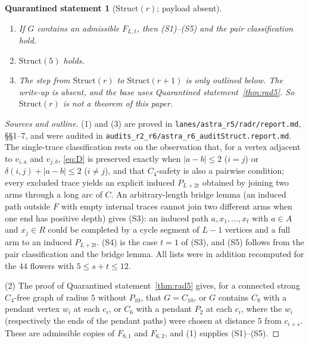 \documentclass[11pt]{amsart}
\newtheorem{qrecord}[theorem]{Quarantined statement}
\theoremstyle{definition}
\theoremstyle{remark}
\begin{document}
\begin{qrecord}[$\mathrm{Struct}(r)$; payload absent]\label{thm:struct}
\begin{enumerate}
\item If $G$ contains an admissible $F_{L,t}$, then \textup{(S1)--(S5)} and the pair classification hold.
\item $\mathrm{Struct}(5)$ holds.
\item The step from $\mathrm{Struct}(r)$ to $\mathrm{Struct}(r+1)$ is only outlined below. The write-up is absent, and the base uses Quarantined statement~\ref{thm:rad5}. So $\mathrm{Struct}(r)$ is not a theorem of this paper.
\end{enumerate}
\end{qrecord}

\begin{proof}[Sources and outline]
(1) and (3) are proved in \nolinkurl{lanes/astra_r5/radr/report.md}, \S\S1--7, and were audited in \nolinkurl{audits_r2_r6/astra_r6_auditStruct.report.md}. The single-trace classification rests on the observation that, for a vertex adjacent to $v_{i,a}$ and $v_{j,b}$, \eqref{eq:D} is preserved exactly when $|a-b|\le2$ ($i=j$) or $\delta(i,j)+|a-b|\le2$ ($i\ne j$), and that $C_4$-safety is also a pairwise condition; every excluded trace yields an explicit induced $P_{L+2t}$ obtained by joining two arms through a long arc of $C$. An arbitrary-length bridge lemma (an induced path outside $F$ with empty internal traces cannot join two different arms when one end has positive depth) gives (S3): an induced path $a,x_1,\dots,x_t$ with $a\in A$ and $x_j\in R$ could be completed by a cycle segment of $L-1$ vertices and a full arm to an induced $P_{L+2t}$. (S4) is the case $t=1$ of (S3), and (S5) follows from the pair classification and the bridge lemma. All lists were in addition recomputed for the $44$ flowers with $5\le s+t\le12$.

(2) The proof of Quarantined statement~\ref{thm:rad5} gives, for a connected strong $C_4$-free graph of radius $5$ without $P_{10}$, that $G=C_{10}$, or $G$ contains $C_8$ with a pendant vertex $w_i$ at each $c_i$, or $C_6$ with a pendant $P_2$ at each $c_i$, where the $w_i$ (respectively the ends of the pendant paths) were chosen at distance $5$ from $c_{i+s}$. These are admissible copies of $F_{8,1}$ and $F_{6,2}$, and (1) supplies (S1)--(S5).


\end{proof}
\end{document}
